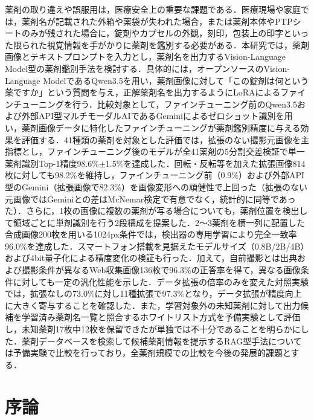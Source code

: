 \documentclass[dvipdfmx]{jsarticle}
\begin{document}
薬剤の取り違えや誤服用は，医療安全上の重要な課題である．医療現場や家庭では，薬剤名が記載された外箱や薬袋が失われた場合，または薬剤本体やPTPシートのみが残された場合に，錠剤やカプセルの外観，刻印，包装上の印字といった限られた視覚情報を手がかりに薬剤を鑑別する必要がある．本研究では，薬剤画像とテキストプロンプトを入力とし，薬剤名を出力するVision-Language Model型の薬剤鑑別手法を検討する．具体的には，オープンソースのVision-Language ModelであるQwen3.5を用い，薬剤画像に対して「この錠剤は何という薬ですか」という質問を与え，正解薬剤名を出力するようにLoRAによるファインチューニングを行う．比較対象として，ファインチューニング前のQwen3.5および外部API型マルチモーダルAIであるGeminiによるゼロショット識別を用い，薬剤画像データに特化したファインチューニングが薬剤鑑別精度に与える効果を評価する．41種類の薬剤を対象とした評価では，拡張のない撮影元画像を主指標とし，ファインチューニング後のモデルが全41薬剤の5分割交差検証で単一薬剤識別Top-1精度98.6\%$\pm$1.5\%を達成した．回転・反転等を加えた拡張画像814枚に対しても98.2\%を維持し，ファインチューニング前（0.9\%）および外部API型のGemini（拡張画像で82.3\%）を画像変形への頑健性で上回った（拡張のない元画像ではGeminiとの差はMcNemar検定で有意でなく，統計的に同等であった）．さらに，1枚の画像に複数の薬剤が写る場合についても，薬剤位置を検出して領域ごとに単剤識別を行う2段構成を提案した．2〜3薬剤を横一列に配置した合成画像200枚を用いる1024px条件では，検出器の専用学習により完全一致率96.0\%を達成した．スマートフォン搭載を見据えたモデルサイズ（0.8B/2B/4B）および4bit量子化による精度変化の検証も行った．加えて，自前撮影とは出典および撮影条件が異なるWeb収集画像136枚で96.3\%の正答率を得て，異なる画像条件に対しても一定の汎化性能を示した．データ拡張の倍率のみを変えた対照実験では，拡張なしの73.0\%に対し11種拡張で97.3\%となり，データ拡張が精度向上に大きく寄与することを確認した．また，学習対象外の未知薬剤に対して出力候補を学習済み薬剤名一覧と照合するホワイトリスト方式を予備実験として評価し，未知薬剤17枚中12枚を保留できたが単独では不十分であることを明らかにした．薬剤データベースを検索して候補薬剤情報を提示するRAG型手法については予備実験で比較を行っており，全薬剤規模での比較を今後の発展的課題とする．

\newpage

\tableofcontents
\newpage
\setcounter{page}{1}
\pagestyle{plain}

\section{序論}\label{sec1}
\end{document}
